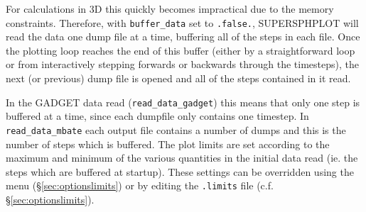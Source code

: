 \documentclass[a4paper,12pt]{article}
\begin{document}
 For calculations in 3D this quickly becomes impractical due to the memory
constraints. Therefore, with \verb+buffer_data+ set to \verb+.false.+, SUPERSPHPLOT
will read the data one dump file at a time, buffering all of the steps in each file.
Once the plotting loop reaches the end of
this buffer (either by a straightforward loop or from interactively stepping
forwards or backwards through the timesteps), the next (or previous) dump file is
opened and all of the steps contained in it read.

 In the GADGET data read (\verb+read_data_gadget+) this means that only one step is buffered at a time, since
each dumpfile only contains one timestep.  In \verb+read_data_mbate+ each output
file contains a number of dumps and this is the number of steps which is
buffered. The plot limits are set according to the maximum and minimum of the
various quantities in the initial data read (ie. the steps which are buffered
at startup). These settings can be overridden using the menu
(\S\vref{sec:optionslimits}) or by editing
the \verb+.limits+ file (c.f. \S\ref{sec:optionslimits}).



\end{document}
